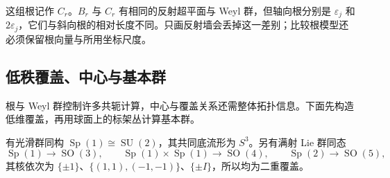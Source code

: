 这组根记作 \(C_r\)。\(B_r\) 与 \(C_r\) 有相同的反射超平面与 Weyl 群，但轴向根分别是 \(\varepsilon_j\) 和 \(2\varepsilon_j\)，它们与斜向根的相对长度不同。只画反射墙会丢掉这一差别；比较根模型还必须保留根向量与所用坐标尺度。

\subsection{低秩覆盖、中心与基本群}
\label{g1:subsec:1905:03}
根与 Weyl 群控制许多共轭计算，中心与覆盖关系还需整体拓扑信息。下面先构造低维覆盖，再用球面上的标架丛计算基本群。

\begin{proposition}\label{g1:prop:quaternion-low-rank}
	有光滑群同构 \(\operatorname{Sp}(1)\cong\operatorname{SU}(2)\)，其共同底流形为 \(S^3\)。另有满射 Lie 群同态
	\[
		\operatorname{Sp}(1)\longrightarrow\operatorname{SO}(3),\qquad
		\operatorname{Sp}(1)\times\operatorname{Sp}(1)\longrightarrow\operatorname{SO}(4),\qquad
		\operatorname{Sp}(2)\longrightarrow\operatorname{SO}(5),
	\]
	其核依次为 \(\{\pm1\}\)、\(\{(1,1),(-1,-1)\}\)、\(\{\pm I\}\)，所以均为二重覆盖。
\end{proposition}
